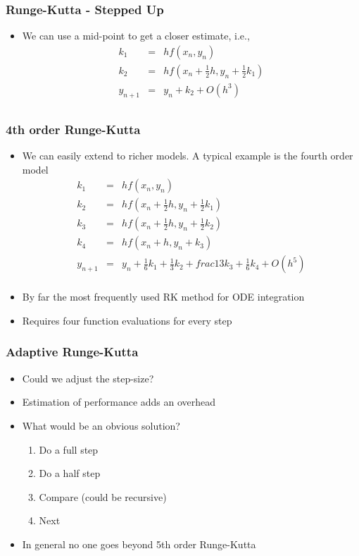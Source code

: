\documentclass[10pt]{beamer}
\begin{document}
\begin{frame}
  \frametitle{Runge-Kutta - Stepped Up}
  \begin{itemize}
  \item We can use a mid-point to get a closer estimate, i.e.,
    \[
      \begin{array}{rcl}
        k_1 & = & h f(x_n, y_n)\\
        k_2 & = & h f( x_n + \frac{1}{2} h, y_n + \frac{1}{2} k_1)\\
        y_{n+1} & = & y_n + k_2 + O(h^3)\\
      \end{array}
    \]
  \end{itemize}
\end{frame}

\begin{frame}
  \frametitle{4th order Runge-Kutta}
  \begin{itemize}
  \item We can easily extend to richer models. A typical example is the fourth order model
    \[
      \begin{array}{rcl}
        k_1 & = & h f( x_n, y_n)\\
        k_2 & = & h f( x_n + \frac{1}{2} h, y_n + \frac{1}{2} k_1)\\ 
        k_3 & = & h f( x_n + \frac{1}{2} h, y_n + \frac{1}{2} k_2)\\
        k_4 & = & h f( x_n + h, y_n + k_3)\\
        y_{n+1} & = & y_n + \frac{1}{6} k_1 + \frac{1}{3} k_2 + frac{1}{3} k_3 + \frac{1}{6} k_4 + O(h^5)\\        
      \end{array}
    \]
  \item By far the most frequently used RK method for ODE integration
  \item Requires four function evaluations for every step
  \end{itemize}
\end{frame}

\begin{frame}
  \frametitle{Adaptive Runge-Kutta}
  \begin{itemize}
  \item Could we adjust the step-size? 
  \item Estimation of performance adds an overhead
  \item What would be an obvious solution? \pause
    \begin{enumerate}
    \item Do a full step
    \item Do a half step
    \item Compare (could be recursive)
    \item Next
    \end{enumerate}
  \item In general no one goes beyond 5th order Runge-Kutta
  \end{itemize}
\end{frame}
\end{document}
